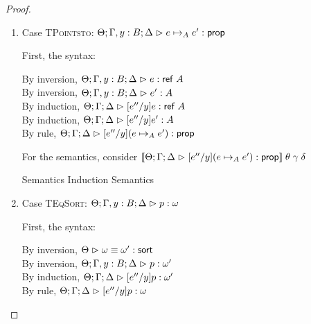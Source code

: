 \begin{proof}
\begin{enumerate}
\item Case \textsc{TPointsto}: $\judgeA[\Theta; \Gamma, y:B; \Delta]{e \pointsto_A e'}{\assert}$

  First, the syntax:
  \begin{tabbedproof}
    \oo By inversion, $\judgeA[\Theta; \Gamma, y:B; \Delta]{e}{\reftype{A}}$ \\
    \oo By inversion, $\judgeA[\Theta; \Gamma, y:B; \Delta]{e'}{A}$ \\
    \oo By induction, $\judgeA[\Theta; \Gamma; \Delta]{[e''/y]e}{\reftype{A}}$ \\
    \oo By induction, $\judgeA[\Theta; \Gamma; \Delta]{[e''/y]e'}{A}$ \\
    \oo By rule, $\judgeA[\Theta; \Gamma; \Delta]{[e''/y](e \pointsto_A e')}{\assert}$
  \end{tabbedproof}

  For the semantics, consider $\interp{\judgeA[\Theta; \Gamma; \Delta]{[e''/y](e \pointsto_A e')}{\assert}}\;\theta\;\gamma\;\delta$
  \begin{eqnproof}
          {Semantics}
          {Induction}
          {Semantics}
  \end{eqnproof}

\item Case \textsc{TEqSort}: $\judgeA[\Theta; \Gamma, y:B; \Delta]{p}{\omega}$
  
  First, the syntax:
  \begin{tabbedproof}
    \oo By inversion, $\judgeSortEq{\omega}{\omega'}$ \\
    \oo By inversion, $\judgeA[\Theta; \Gamma, y:B; \Delta]{p}{\omega'}$ \\
    \oo By induction, $\judgeA[\Theta; \Gamma; \Delta]{[e''/y]p}{\omega'}$ \\
    \oo By rule, $\judgeA[\Theta; \Gamma; \Delta]{[e''/y]p}{\omega}$ \\
  \end{tabbedproof}


\end{enumerate}
\end{proof}
